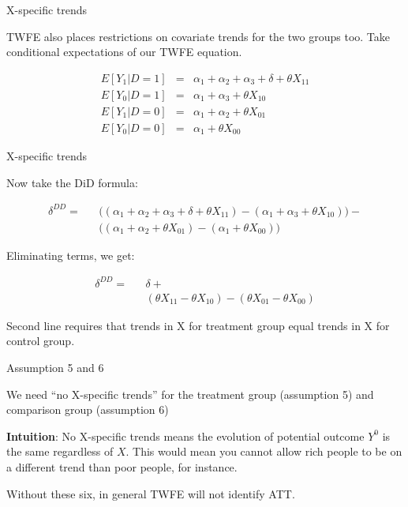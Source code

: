 \documentclass{beamer}
\begin{document}
\begin{frame}{X-specific trends}

TWFE also places restrictions on covariate trends for the two groups too.  Take conditional expectations of our TWFE equation.

\begin{eqnarray*}
E[Y_1|D=1] &=& \alpha_1 + \alpha_2 + \alpha_3 + \delta + \theta X_{11} \\
E[Y_0|D=1] &=& \alpha_1 + \alpha_3 + \theta X_{10} \\
E[Y_1|D=0] &=& \alpha_1 + \alpha_2 + \theta X_{01} \\
E[Y_0|D=0] &=& \alpha_1 + \theta X_{00}
\end{eqnarray*}


\end{frame}


\begin{frame}{X-specific trends}

Now take the DiD formula:

\begin{eqnarray*}
\delta^{DD} = &&\bigg ( (\alpha_1 + \alpha_2 + \alpha_3 + \delta + \theta X_{11} ) - (\alpha_1 + \alpha_3 + \theta X_{10} ) \bigg )- \\
&& \bigg ( (\alpha_1 + \alpha_2 + \theta X_{01}) - (\alpha_1 + \theta X_{00}) \bigg )
\end{eqnarray*}

\bigskip

Eliminating terms, we get:

\begin{eqnarray*}
\delta^{DD} = &&\delta + \\
&& (\theta X_{11} - \theta X_{10} ) - (\theta X_{01} - \theta X_{00} )
\end{eqnarray*}

\bigskip

Second line requires that trends in X for treatment group equal trends in X for control group.

\end{frame}


\begin{frame}{Assumption 5 and 6}

We need ``no X-specific trends'' for the treatment group (assumption 5) and comparison group (assumption 6)

\bigskip

\textbf{Intuition}: No X-specific trends means the evolution of potential outcome $Y^0$ is the same regardless of $X$. This would mean you cannot allow rich people to be on a different trend than poor people, for instance.

\bigskip

Without these six, in general TWFE will not identify ATT.

\end{frame}
\end{document}
